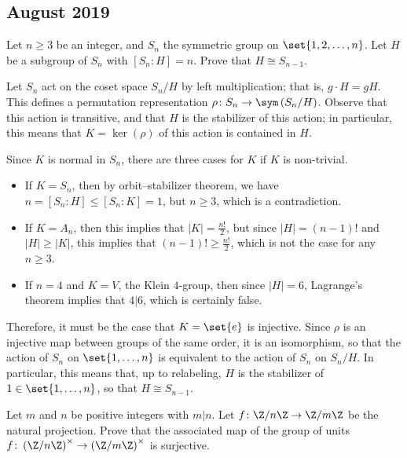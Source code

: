 \documentclass[10pt]{mypackage}
\begin{document}
\subsection{August 2019}%
\begin{problem}[Problem 2]
  Let $n\geq 3$ be an integer, and $S_n$ the symmetric group on $\set{1,2,\dots,n}$. Let $H$ be a subgroup of $S_n$ with $\left[ S_n:H \right] = n$. Prove that $H\cong S_{n-1}$.
\end{problem}
\begin{solution}
  Let $S_n$ act on the coset space $S_n/H$ by left multiplication; that is, $g\cdot H = gH$. This defines a permutation representation $\rho\colon S_n\rightarrow \sym\left( S_n/H \right)$. Observe that this action is transitive, and that $H$ is the stabilizer of this action; in particular, this means that $K = \ker\left( \rho \right)$ of this action is contained in $H$.

  Since $K$ is normal in $S_n$, there are three cases for $K$ if $K$ is non-trivial.
  \begin{itemize}
    \item If $K = S_n$, then by orbit--stabilizer theorem, we have $n=\left[ S_n:H \right]\leq \left[ S_n:K \right] = 1$, but $n\geq 3$, which is a contradiction.
    \item If $K = A_n$, then this implies that $\left\vert K \right\vert = \frac{n!}{2}$, but since $\left\vert H \right\vert = \left( n-1 \right)!$ and $\left\vert H \right\vert\geq \left\vert K \right\vert$, this implies that $\left( n-1 \right)!\geq \frac{n!}{2}$, which is not the case for any $n\geq 3$.
    \item If $n = 4$ and $K = V$, the Klein $4$-group, then since $\left\vert H \right\vert = 6$, Lagrange's theorem implies that $4 | 6$, which is certainly false.
  \end{itemize}
  Therefore, it must be the case that $K = \set{e}$ is injective. Since $\rho$ is an injective map between groups of the same order, it is an isomorphism, so that the action of $S_n$ on $\set{1,\dots,n}$ is equivalent to the action of $S_n$ on $S_n/H$. In particular, this means that, up to relabeling, $H$ is the stabilizer of $1\in \set{1,\dots,n}$, so that $H\cong S_{n-1}$.
\end{solution}
\begin{problem}[Problem 3]
  Let $m$ and $n$ be positive integers with $m | n$. Let $f\colon \Z/n\Z\rightarrow \Z/m\Z$ be the natural projection. Prove that the associated map of the group of units $f\colon \left( \Z/n\Z \right)^{\times}\rightarrow \left( \Z/m\Z \right)^{\times}$ is surjective.
\end{problem}
\end{document}
